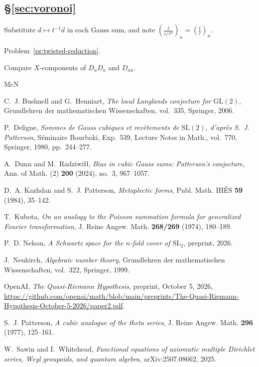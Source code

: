 \documentclass[reqno]{amsart}
\providecommand{\qr}[2]{\left(\frac{#1}{#2}\right)}
\numberwithin{equation}{section}
\theoremstyle{definition}
\theoremstyle{plain}
\newenvironment{hints}{\begin{description}[font=\normalfont\bfseries]}{\end{description}}
\begin{document}
\subsection*{\S\ref{sec:voronoi}}
\begin{hints}
\item[\ref{pr:frequency-twist}] Substitute $d \mapsto t^{-1} d$ in each Gauss sum, and note $\qr{t}{c / \tau^n}_n = \qr{t}{c}_n$.
\item[\ref{pr:first-symbol}] Problem~\ref{pr:twisted-reduction}.
\item[\ref{pr:commutator}] Compare $X$-components of $D_u D_a$ and $D_{a u}$.
\end{hints}

\begin{thebibliography}{McN}

C.~J. Bushnell and G.~Henniart, \emph{The local {L}anglands conjecture for {$\mathrm{GL}(2)$}}, Grundlehren der mathematischen Wissenschaften, vol.~335, Springer, 2006.

P.~Deligne, \emph{Sommes de {G}auss cubiques et rev\^etements de {$\mathrm{SL}(2)$}, d'apr\`es {S}.~{J}. {P}atterson}, S\'eminaire Bourbaki, Exp.~539, Lecture Notes in Math., vol.~770, Springer, 1980, pp.~244--277.

A.~Dunn and M.~Radziwi\l\l, \emph{Bias in cubic {G}auss sums: {P}atterson's conjecture}, Ann. of Math. (2) \textbf{200} (2024), no.~3, 967--1057.

D.~A. Kazhdan and S.~J. Patterson, \emph{Metaplectic forms}, Publ. Math. IH\'ES \textbf{59} (1984), 35--142.

T.~Kubota, \emph{On an analogy to the {P}oisson summation formula for generalized {F}ourier transformation}, J. Reine Angew. Math. \textbf{268/269} (1974), 180--189.

P.~D. Nelson, \emph{A {S}chwartz space for the $n$-fold cover of $\mathrm{SL}_2$}, preprint, 2026.

J.~Neukirch, \emph{Algebraic number theory}, Grundlehren der mathematischen Wissenschaften, vol.~322, Springer, 1999.

OpenAI, \emph{The {Q}uasi-{R}iemann {H}ypothesis}, preprint, October 5, 2026, \url{https://github.com/openai/math/blob/main/preprints/The-Quasi-Riemann-Hypothesis-October-5-2026/paper2.pdf}.

S.~J. Patterson, \emph{A cubic analogue of the theta series}, J. Reine Angew. Math. \textbf{296} (1977), 125--161.

W.~Sawin and I.~Whitehead, \emph{Functional equations of axiomatic multiple {D}irichlet series, {W}eyl groupoids, and quantum algebra}, arXiv:2507.08662, 2025.

\end{thebibliography}
\end{document}
